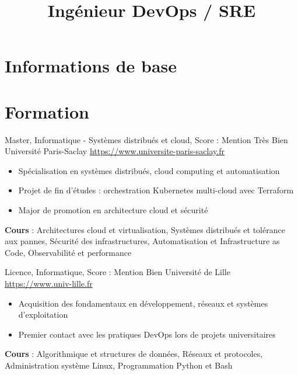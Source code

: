 \documentclass[a4paper, serif, 10pt]{moderncv}
\title{Ingénieur DevOps / SRE}
\begin{document}
\maketitle

\section{Informations de base}

\section{Formation}

        {Master, Informatique - Systèmes distribués et cloud, Score : Mention Très Bien}
        {Université Paris-Saclay}
        {\url{https://www.universite-paris-saclay.fr}}
        {}
        {\begin{itemize}
\item Spécialisation en systèmes distribués, cloud computing et automatisation
\item Projet de fin d'études : orchestration Kubernetes multi-cloud avec Terraform
\item Major de promotion en architecture cloud et sécurité
\end{itemize}
\textbf{Cours} : Architectures cloud et virtualisation, Systèmes distribués et tolérance aux pannes, Sécurité des infrastructures, Automatisation et Infrastructure as Code, Observabilité et performance}

        {Licence, Informatique, Score : Mention Bien}
        {Université de Lille}
        {\url{https://www.univ-lille.fr}}
        {}
        {\begin{itemize}
\item Acquisition des fondamentaux en développement, réseaux et systèmes d'exploitation
\item Premier contact avec les pratiques DevOps lors de projets universitaires
\end{itemize}
\textbf{Cours} : Algorithmique et structures de données, Réseaux et protocoles, Administration système Linux, Programmation Python et Bash}
\end{document}
